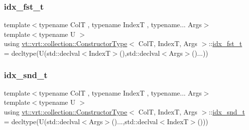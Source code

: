 \mbox{\label{structvt_1_1vrt_1_1collection_1_1_constructor_type_a1c790c5cce774596e5027eb02fe2e1ca}} 
\subsubsection{\texorpdfstring{idx\+\_\+fst\+\_\+t}{idx\_fst\_t}}
{\footnotesize\ttfamily template$<$typename ColT , typename IndexT , typename... Args$>$ \\
template$<$typename U $>$ \\
using \hyperlink{structvt_1_1vrt_1_1collection_1_1_constructor_type}{vt\+::vrt\+::collection\+::\+Constructor\+Type}$<$ ColT, IndexT, Args $>$\+::\hyperlink{structvt_1_1vrt_1_1collection_1_1_constructor_type_a1c790c5cce774596e5027eb02fe2e1ca}{idx\+\_\+fst\+\_\+t} =  decltype(U(std\+::declval$<$IndexT$>$(),std\+::declval$<$Args$>$()...))}

\mbox{\label{structvt_1_1vrt_1_1collection_1_1_constructor_type_a816208396419304c8a615ce54fbee9c8}} 
\subsubsection{\texorpdfstring{idx\+\_\+snd\+\_\+t}{idx\_snd\_t}}
{\footnotesize\ttfamily template$<$typename ColT , typename IndexT , typename... Args$>$ \\
template$<$typename U $>$ \\
using \hyperlink{structvt_1_1vrt_1_1collection_1_1_constructor_type}{vt\+::vrt\+::collection\+::\+Constructor\+Type}$<$ ColT, IndexT, Args $>$\+::\hyperlink{structvt_1_1vrt_1_1collection_1_1_constructor_type_a816208396419304c8a615ce54fbee9c8}{idx\+\_\+snd\+\_\+t} =  decltype(U(std\+::declval$<$Args$>$()...,std\+::declval$<$IndexT$>$()))}

\mbox{\label{structvt_1_1vrt_1_1collection_1_1_constructor_type_a25485f9d6d78bd2e7d43f41562411d6a}} 
